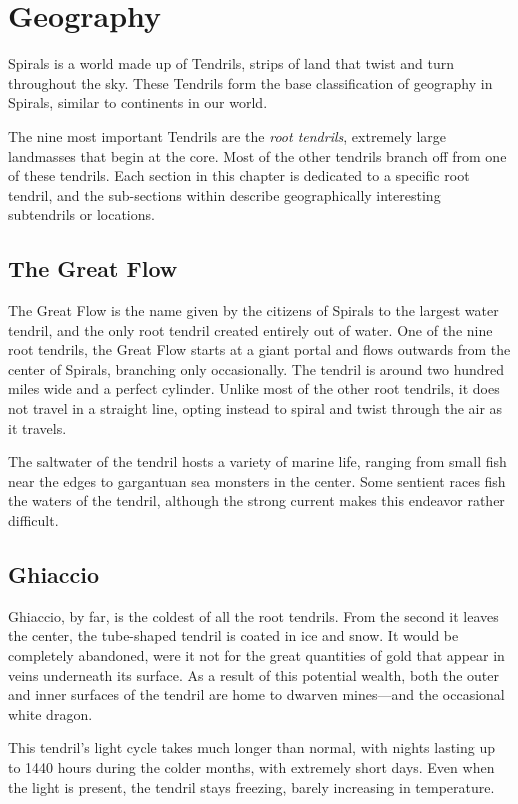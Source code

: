 \chapter{Geography}
Spirals is a world made up of Tendrils, strips of land that twist and turn throughout the sky.
These Tendrils form the base classification of geography in Spirals, similar to continents in our world.

The nine most important Tendrils are the \textit{root tendrils}, extremely large landmasses that begin at the core.
Most of the other tendrils branch off from one of these tendrils.
Each section in this chapter is dedicated to a specific root tendril, and the sub-sections within describe geographically interesting subtendrils or locations.

\begin{multicols}{2}
\section{The Great Flow}
The Great Flow is the name given by the citizens of Spirals to the largest water tendril, and the only root tendril created entirely out of water.
One of the nine root tendrils, the Great Flow starts at a giant portal and flows outwards from the center of Spirals, branching only occasionally.
The tendril is around two hundred miles wide and a perfect cylinder.
Unlike most of the other root tendrils, it does not travel in a straight line, opting instead to spiral and twist through the air as it travels.

The saltwater of the tendril hosts a variety of marine life, ranging from small fish near the edges to gargantuan sea monsters in the center.
Some sentient races fish the waters of the tendril, although the strong current makes this endeavor rather difficult.

\section{Ghiaccio}
Ghiaccio, by far, is the coldest of all the root tendrils.
From the second it leaves the center, the tube-shaped tendril is coated in ice and snow.
It would be completely abandoned, were it not for the great quantities of gold that appear in veins underneath its surface.
As a result of this potential wealth, both the outer and inner surfaces of the tendril are home to dwarven mines---and the occasional white dragon.

This tendril's light cycle takes much longer than normal, with nights lasting up to 1440 hours during the colder months, with extremely short days.
Even when the light is present, the tendril stays freezing, barely increasing in temperature.


\end{multicols}
